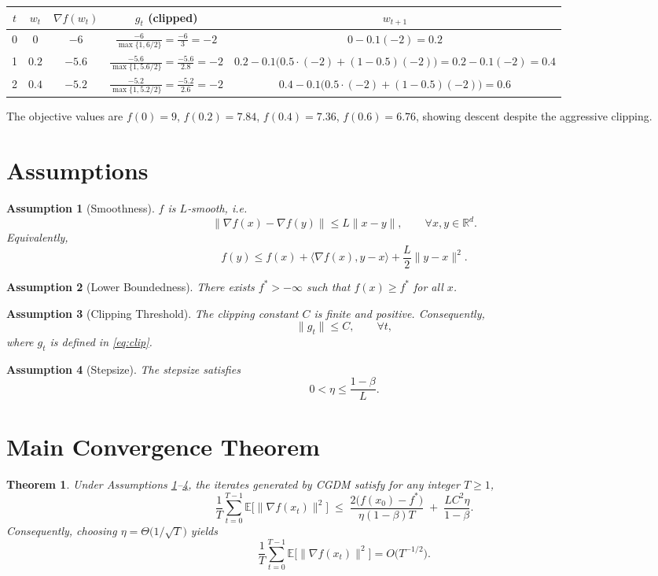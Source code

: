 \documentclass{article}
\newtheorem{theorem}{Theorem}
\newtheorem{assumption}{Assumption}
\newcommand{\E}{\mathbb{E}}
\newcommand{\R}{\mathbb{R}}
\begin{document}
\begin{center}
\begin{tabular}{c|c|c|c|c}
$t$ & $w_t$ & $\nabla f(w_t)$ & $g_t$ (clipped) & $w_{t+1}$ \\ \hline
0 & $0$ & $-6$ & $\displaystyle\frac{-6}{\max\{1,6/2\}}=\frac{-6}{3}=-2$ & $0-0.1(-2)=0.2$ \\[4pt]
1 & $0.2$ & $-5.6$ & $\displaystyle\frac{-5.6}{\max\{1,5.6/2\}}=\frac{-5.6}{2.8}=-2$ & $0.2-0.1\bigl(0.5\cdot(-2)+(1-0.5)(-2)\bigr)=0.2-0.1(-2) =0.4$ \\[4pt]
2 & $0.4$ & $-5.2$ & $\displaystyle\frac{-5.2}{\max\{1,5.2/2\}}=\frac{-5.2}{2.6}=-2$ & $0.4-0.1\bigl(0.5\cdot(-2)+(1-0.5)(-2)\bigr)=0.6$
\end{tabular}
\end{center}

The objective values are $f(0)=9$, $f(0.2)=7.84$, $f(0.4)=7.36$, $f(0.6)=6.76$,
showing descent despite the aggressive clipping.

\newpage
\section*{Assumptions}
\begin{assumption}[Smoothness]\label{ass:smooth}
$f$ is $L$‑smooth, i.e.
\[
    \|\nabla f(x)-\nabla f(y)\|\le L\|x-y\|,\qquad\forall x,y\in\R^{d}.
\]
Equivalently,
\[
    f(y)\le f(x)+\langle\nabla f(x),y-x\rangle+\frac{L}{2}\|y-x\|^{2}.
\]
\end{assumption}

\begin{assumption}[Lower Boundedness]\label{ass:lb}
There exists $f^{*}>-\infty$ such that $f(x)\ge f^{*}$ for all $x$.
\end{assumption}

\begin{assumption}[Clipping Threshold]\label{ass:C}
The clipping constant $C$ is finite and positive. Consequently,
\[
    \|g_t\| \le C,\qquad\forall t,
\]
where $g_t$ is defined in \eqref{eq:clip}.
\end{assumption}

\begin{assumption}[Stepsize]\label{ass:eta}
The stepsize satisfies
\[
    0<\eta\le \frac{1-\beta}{L}.
\]
\end{assumption}

\section*{Main Convergence Theorem}
\begin{theorem}\label{thm:main}
Under Assumptions \ref{ass:smooth}–\ref{ass:eta}, the iterates generated by
CGDM satisfy for any integer $T\ge1$,
\[
    \frac{1}{T}\sum_{t=0}^{T-1}\E\!\bigl[\|\nabla f(x_t)\|^{2}\bigr]
    \;\le\;
    \frac{2\bigl(f(x_0)-f^{*}\bigr)}{\eta(1-\beta)T}
    \;+\;
    \frac{L C^{2}\eta}{1-\beta}.
\]
Consequently, choosing $\eta = \Theta\!\bigl(1/\sqrt{T}\bigr)$ yields
\[
    \frac{1}{T}\sum_{t=0}^{T-1}\E\!\bigl[\|\nabla f(x_t)\|^{2}\bigr]
    = O\!\bigl(T^{-1/2}\bigr).
\]
\end{theorem}
\end{document}
